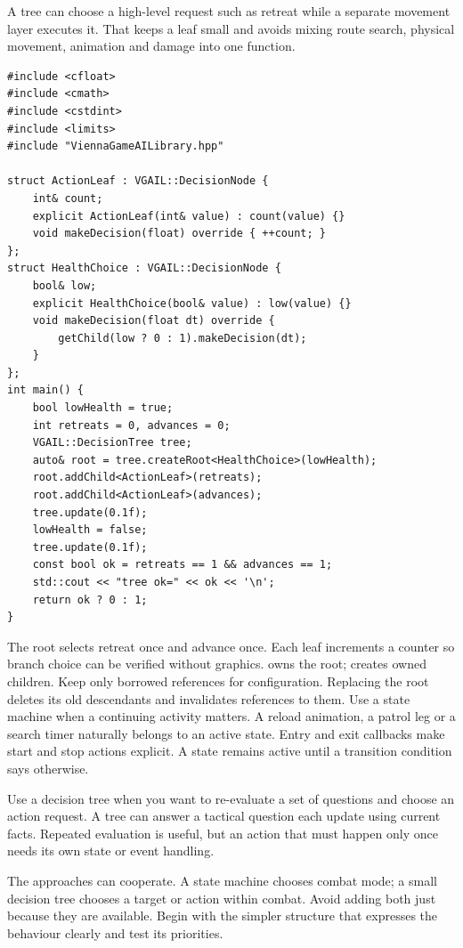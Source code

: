 \documentclass[11pt,a4paper]{article}
\begin{document}
A tree can choose a high-level request such as retreat while a separate movement layer executes it. That keeps a leaf small and avoids mixing route search, physical movement, animation and damage into one function.
\begin{lstlisting}
#include <cfloat>
#include <cmath>
#include <cstdint>
#include <limits>
#include "ViennaGameAILibrary.hpp"

struct ActionLeaf : VGAIL::DecisionNode {
    int& count;
    explicit ActionLeaf(int& value) : count(value) {}
    void makeDecision(float) override { ++count; }
};
struct HealthChoice : VGAIL::DecisionNode {
    bool& low;
    explicit HealthChoice(bool& value) : low(value) {}
    void makeDecision(float dt) override {
        getChild(low ? 0 : 1).makeDecision(dt);
    }
};
int main() {
    bool lowHealth = true;
    int retreats = 0, advances = 0;
    VGAIL::DecisionTree tree;
    auto& root = tree.createRoot<HealthChoice>(lowHealth);
    root.addChild<ActionLeaf>(retreats);
    root.addChild<ActionLeaf>(advances);
    tree.update(0.1f);
    lowHealth = false;
    tree.update(0.1f);
    const bool ok = retreats == 1 && advances == 1;
    std::cout << "tree ok=" << ok << '\n';
    return ok ? 0 : 1;
}
\end{lstlisting}
The root selects retreat once and advance once. Each leaf increments a counter so branch choice can be verified without graphics.  owns the root;  creates owned children. Keep only borrowed references for configuration. Replacing the root deletes its old descendants and invalidates references to them.
Use a state machine when a continuing activity matters. A reload animation, a patrol leg or a search timer naturally belongs to an active state. Entry and exit callbacks make start and stop actions explicit. A state remains active until a transition condition says otherwise.

Use a decision tree when you want to re-evaluate a set of questions and choose an action request. A tree can answer a tactical question each update using current facts. Repeated evaluation is useful, but an action that must happen only once needs its own state or event handling.

The approaches can cooperate. A state machine chooses combat mode; a small decision tree chooses a target or action within combat. Avoid adding both just because they are available. Begin with the simpler structure that expresses the behaviour clearly and test its priorities.
\end{document}
